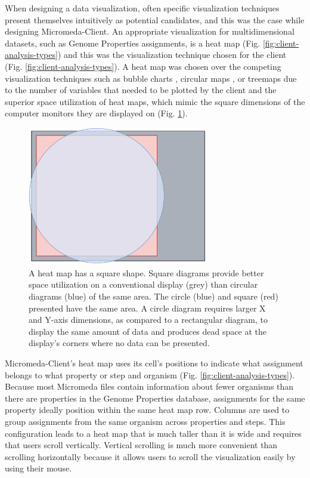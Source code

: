 When designing a data visualization, often specific visualization techniques present themselves intuitively as potential candidates, and this was the case while designing Micromeda-Client. An appropriate visualization for multidimensional datasets, such as Genome Properties assignments, is a heat map \cite{wilkinson2009history,tufte2001visual}(Fig. \ref{fig:client-analysis-types}) and this was the visualization technique chosen for the client (Fig. \ref{fig:client-analysis-types}). A heat map was chosen over the competing visualization techniques such as bubble charts \cite{tufte2001visual}, circular maps \cite{ward2002taxonomy,stothard2004circular}, or treemaps \cite{shneiderman1998tree} due to the number of variables that needed to be plotted by the client and the superior space utilization of heat maps, which mimic the square dimensions of the computer monitors they are displayed on (Fig. \ref{fig:circle-square}).

\begin{figure}[!ht]
  \centering
	\includegraphics[width=0.7\textwidth]{media/square_vs_circle.pdf}
	 \caption{A heat map has a square shape. Square diagrams provide better space utilization on a conventional display (grey) than circular diagrams (blue) of the same area. The circle (blue) and square (red) presented have the same area. A circle diagram requires larger X and Y-axis dimensions, as compared to a rectangular diagram, to display the same amount of data and produces dead space at the display's corners where no data can be presented.}
	 \label{fig:circle-square}
\end{figure}

Micromeda-Client's heat map uses its cell's positions to indicate what assignment belongs to what property or step and organism (Fig. \ref{fig:client-analysis-types}). Because most Micromeda files contain information about fewer organisms than there are properties in the Genome Properties database, assignments for the same property ideally position within the same heat map row. Columns are used to group assignments from the same organism across properties and steps. This configuration leads to a heat map that is much taller than it is wide and requires that users scroll vertically. Vertical scrolling is much more convenient than scrolling horizontally because it allows users to scroll the visualization easily by using their mouse.

